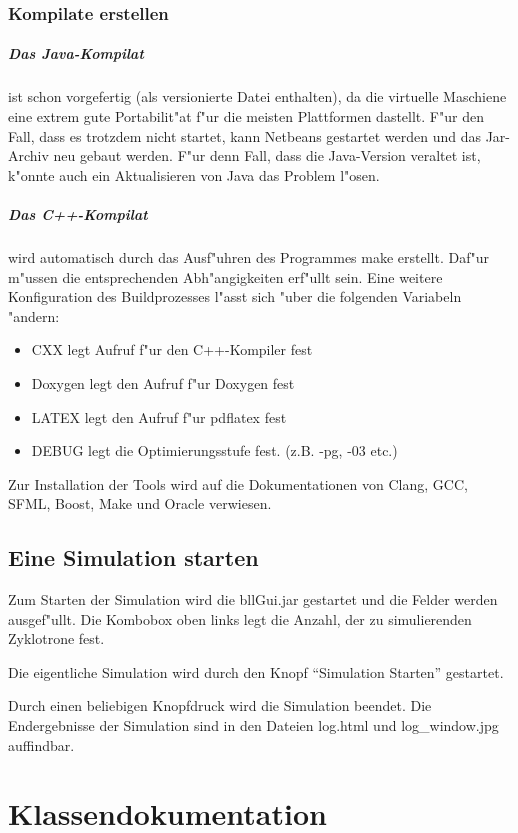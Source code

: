 \documentclass[14pt, a4paper]{report}
\begin{document}
\subsection{Kompilate erstellen}
\paragraph{Das Java-Kompilat} ist schon vorgefertig (als versionierte Datei enthalten), 
da die virtuelle Maschiene eine 
extrem gute Portabilit"at f"ur die meisten Plattformen dastellt. F"ur den Fall, dass es
trotzdem nicht startet, kann Netbeans gestartet werden und das Jar-Archiv neu gebaut werden.
F"ur denn Fall, dass die Java-Version veraltet ist, k"onnte auch ein Aktualisieren von 
Java das Problem l"osen.

\paragraph{Das C++-Kompilat} wird automatisch durch das Ausf"uhren des Programmes make
erstellt. Daf"ur m"ussen die entsprechenden Abh"angigkeiten erf"ullt sein. Eine weitere
Konfiguration des Buildprozesses l"asst sich "uber die folgenden Variabeln "andern:
\begin{itemize}
\item CXX legt Aufruf f"ur den C++-Kompiler fest
\item Doxygen legt den Aufruf f"ur Doxygen fest
\item LATEX legt den Aufruf f"ur pdflatex fest 
\item DEBUG legt die Optimierungsstufe fest. (z.B. -pg, -03 etc.)
\end{itemize}

Zur Installation der Tools wird auf die Dokumentationen von Clang, GCC, SFML, Boost, Make und
Oracle verwiesen.

\section{Eine Simulation starten}
Zum Starten der Simulation wird die bllGui.jar gestartet und die Felder werden 
ausgef"ullt. Die Kombobox oben links legt die Anzahl, der zu simulierenden Zyklotrone 
fest.

Die eigentliche Simulation wird durch den Knopf "`Simulation Starten"' gestartet.

Durch einen beliebigen Knopfdruck wird die Simulation beendet. Die Endergebnisse der
Simulation sind in den Dateien log.html und log\_window.jpg auffindbar.

\chapter{Klassendokumentation}
\newpage
\end{document}
